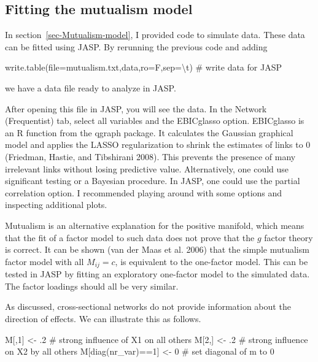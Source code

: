 \documentclass[
  a4paper,
  DIV=11,
  numbers=noendperiod,
  oneside]{scrreprt}
\newenvironment{Shaded}{}{}
\newcommand{\AttributeTok}[1]{\textcolor[rgb]{0.84,0.23,0.29}{#1}}
\newcommand{\CommentTok}[1]{\textcolor[rgb]{0.42,0.45,0.49}{#1}}
\newcommand{\DecValTok}[1]{\textcolor[rgb]{0.00,0.36,0.77}{#1}}
\newcommand{\FunctionTok}[1]{\textcolor[rgb]{0.44,0.26,0.76}{#1}}
\newcommand{\NormalTok}[1]{\textcolor[rgb]{0.14,0.16,0.18}{#1}}
\newcommand{\OtherTok}[1]{\textcolor[rgb]{0.44,0.26,0.76}{#1}}
\newcommand{\SpecialCharTok}[1]{\textcolor[rgb]{0.00,0.36,0.77}{#1}}
\newcommand{\StringTok}[1]{\textcolor[rgb]{0.01,0.18,0.38}{#1}}
\begin{document}
\subsection{Fitting the mutualism
model}\label{sec-Fitting-the-mutualism-model}

In section~\ref{sec-Mutualism-model}, I provided code to simulate data.
These data can be fitted using JASP. By rerunning the previous code and
adding

\begin{Shaded}
\begin{Highlighting}[]
\FunctionTok{write.table}\NormalTok{(}\AttributeTok{file=}\StringTok{\textquotesingle{}mutualism.txt\textquotesingle{}}\NormalTok{,data,}\AttributeTok{ro=}\NormalTok{F,}\AttributeTok{sep=}\StringTok{\textquotesingle{}}\SpecialCharTok{\textbackslash{}t}\StringTok{\textquotesingle{}}\NormalTok{) }\CommentTok{\# write data for JASP}
\end{Highlighting}
\end{Shaded}

we have a data file ready to analyze in JASP.

After opening this file in JASP, you will see the data. In the Network
(Frequentist) tab, select all variables and the EBICglasso option.
EBICglasso is an R function from the qgraph package. It calculates the
Gaussian graphical model and applies the LASSO regularization to shrink
the estimates of links to 0 (Friedman, Hastie, and Tibshirani 2008).
This prevents the presence of many irrelevant links without losing
predictive value. Alternatively, one could use significant testing or a
Bayesian procedure. In JASP, one could use the partial correlation
option. I recommended playing around with some options and inspecting
additional plots.

Mutualism is an alternative explanation for the positive manifold, which
means that the fit of a factor model to such data does not prove that
the \(g\) factor theory is correct. It can be shown (van der Maas et al.
2006) that the simple mutualism factor model with all \(M_{ij} = c\), is
equivalent to the one-factor model. This can be tested in JASP by
fitting an exploratory one-factor model to the simulated data. The
factor loadings should all be very similar.

As discussed, cross-sectional networks do not provide information about
the direction of effects. We can illustrate this as follows.

\begin{Shaded}
\begin{Highlighting}[]
\NormalTok{M[,}\DecValTok{1}\NormalTok{] }\OtherTok{\textless{}{-}}\NormalTok{ .}\DecValTok{2} \CommentTok{\# strong influence of X1 on all others}
\NormalTok{M[}\DecValTok{2}\NormalTok{,] }\OtherTok{\textless{}{-}}\NormalTok{ .}\DecValTok{2} \CommentTok{\# strong influence on X2 by all others}
\NormalTok{M[}\FunctionTok{diag}\NormalTok{(nr\_var)}\SpecialCharTok{==}\DecValTok{1}\NormalTok{] }\OtherTok{\textless{}{-}} \DecValTok{0} \CommentTok{\# set diagonal of m to 0}
\end{Highlighting}
\end{Shaded}
\end{document}
